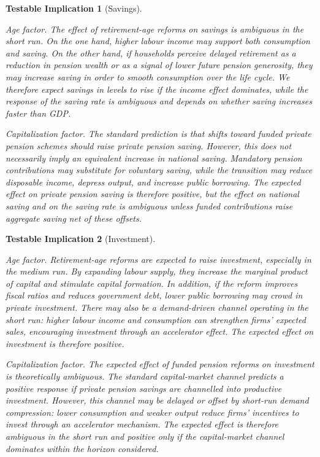 \documentclass[11pt,english,a4paper, twoside, authoryear]{article}
\newtheorem{testable}{Testable Implication}}
\begin{document}
\begin{testable}[Savings]\label{test:sav}


\emph{Age factor.} The effect of retirement-age reforms on savings is ambiguous in the short run. On the one hand, higher labour income may support both consumption and saving. On the other hand, if households perceive delayed retirement as a reduction in pension wealth or as a signal of lower future pension generosity, they may increase saving in order to smooth consumption over the life cycle. We therefore expect savings in levels to rise if the income effect dominates, while the response of the saving rate is ambiguous and depends on whether saving increases faster than GDP.

\emph{Capitalization factor.} The standard prediction is that shifts toward funded private pension schemes should raise private pension saving. However, this does not necessarily imply an equivalent increase in national saving. Mandatory pension contributions may substitute for voluntary saving, while the transition may reduce disposable income, depress output, and increase public borrowing. The expected effect on private pension saving is therefore positive, but the effect on national saving and on the saving rate is ambiguous unless funded contributions raise aggregate saving net of these offsets.

\end{testable}



\begin{testable}[Investment]\label{test:inv}

\emph{Age factor.} Retirement-age reforms are expected to raise investment, especially in the medium run. By expanding labour supply, they increase the marginal product of capital and stimulate capital formation. In addition, if the reform improves fiscal ratios and reduces government debt, lower public borrowing may crowd in private investment. There may also be a demand-driven channel operating in the short run: higher labour income and consumption can strengthen firms' expected sales, encouraging investment through an accelerator effect. The expected effect on investment is therefore positive.

\emph{Capitalization factor.} The expected effect of funded pension reforms on investment is theoretically ambiguous. The standard capital-market channel predicts a positive response if private pension savings are channelled into productive investment. However, this channel may be delayed or offset by short-run demand compression: lower consumption and weaker output reduce firms' incentives to invest through an accelerator mechanism. The expected effect is therefore ambiguous in the short run and positive only if the capital-market channel dominates within the horizon considered.

\end{testable}
\end{document}
